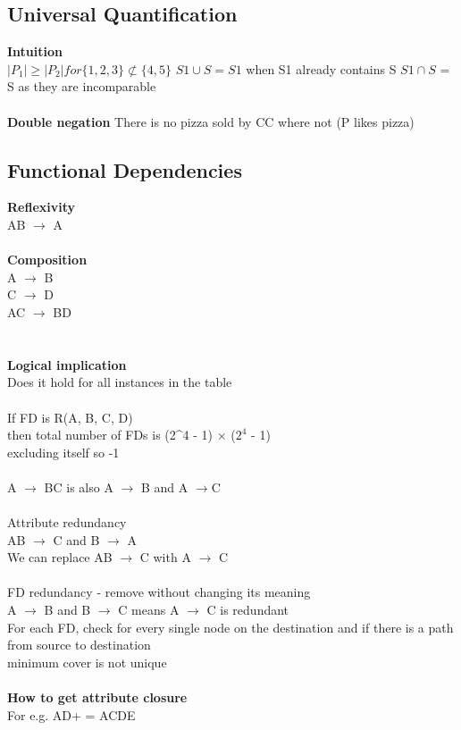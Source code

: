 \documentclass[11pt]{article}
\begin{document}
\subsection*{Universal Quantification}
\textbf{Intuition}
\\
$|P_{1}| \geq |P_{2}| for \{1, 2, 3\} \not\subset \{4, 5\}$
$S1 \cup S = S1$ when S1 already contains S
$S1 \cap S$ = S
as they are incomparable
\\\\
\textbf{Double negation}
There is no pizza sold by CC where not (P likes pizza) 
\subsection*{Functional Dependencies}
\textbf{Reflexivity}\\
AB $\rightarrow$ A 
\\\\
\textbf{Composition}\\
A $\rightarrow$ B \\
C $\rightarrow$ D \\
AC $\rightarrow$ BD \\
\\
\\
\textbf{Logical implication}\\
Does it hold for all instances in the table
\\\\
If FD is R(A, B, C, D)\\
then total number of FDs is (2^4 - 1) $\times$  ($2^4$ - 1)\\
excluding itself so -1\\
\\
A $\rightarrow$ BC is also A $\rightarrow$ B and A $\rightarrow $C
\\\\
Attribute redundancy\\
AB $\rightarrow$ C and B $\rightarrow$ A
\\
We can replace AB $\rightarrow$ C with A $\rightarrow$ C
\\
\\
FD redundancy - remove without changing its meaning\\
A $\rightarrow$ B and B $\rightarrow$ C means A $\rightarrow$ C is redundant\\
For each FD, check for every single node on the destination and if there is a path from source to destination
\\
minimum cover is not unique
\\
\\
\textbf{How to get attribute closure}\\
For e.g. AD+ = ACDE\\\\
\end{document}

